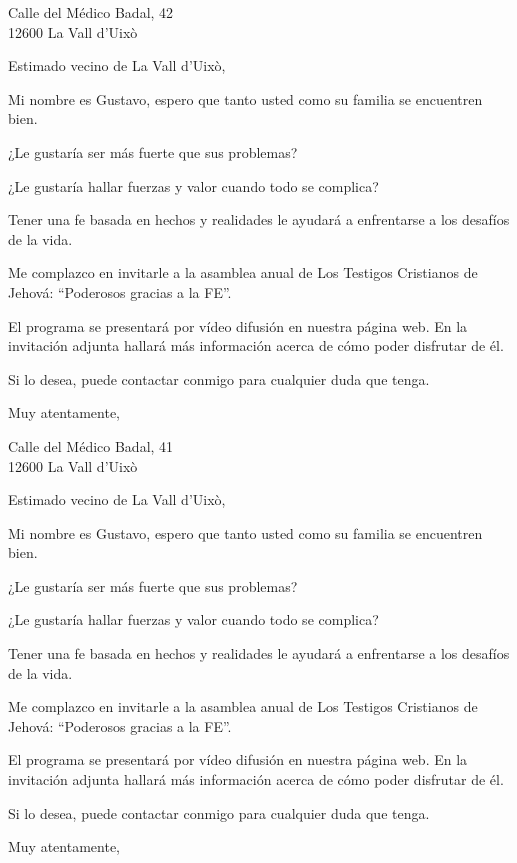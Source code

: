 \documentclass{scrlttr2}
\begin{document}
\begin{letter}{%
Calle del Médico Badal, 42\\
12600 La Vall d'Uixò\\
}
\opening{Estimado vecino de La Vall d'Uixò,}

Mi nombre es Gustavo, espero que tanto usted como su familia se encuentren bien.

¿Le gustaría ser más fuerte que sus problemas?

¿Le gustaría hallar fuerzas y valor cuando todo se complica?

Tener una fe basada en hechos y realidades le ayudará a enfrentarse a los desafíos de la vida.

Me complazco en invitarle a la asamblea anual de Los Testigos Cristianos de Jehová: ``Poderosos gracias a la FE''.

El programa se presentará por vídeo difusión en nuestra página web. En la invitación adjunta hallará más información acerca de cómo poder disfrutar de él.

Si lo desea, puede contactar conmigo para cualquier duda que tenga.

\closing{Muy atentamente,}


\end{letter}
\begin{letter}{%
Calle del Médico Badal, 41\\
12600 La Vall d'Uixò\\
}
\opening{Estimado vecino de La Vall d'Uixò,}

Mi nombre es Gustavo, espero que tanto usted como su familia se encuentren bien.

¿Le gustaría ser más fuerte que sus problemas?

¿Le gustaría hallar fuerzas y valor cuando todo se complica?

Tener una fe basada en hechos y realidades le ayudará a enfrentarse a los desafíos de la vida.

Me complazco en invitarle a la asamblea anual de Los Testigos Cristianos de Jehová: ``Poderosos gracias a la FE''.

El programa se presentará por vídeo difusión en nuestra página web. En la invitación adjunta hallará más información acerca de cómo poder disfrutar de él.

Si lo desea, puede contactar conmigo para cualquier duda que tenga.

\closing{Muy atentamente,}


\end{letter}
\end{document}
